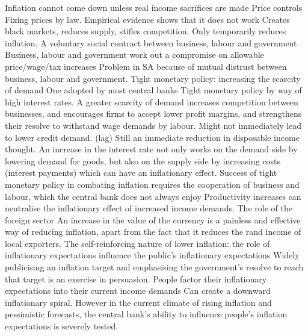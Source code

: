 \documentclass[12pt]{examnotes}
\begin{document}
\ra Inflation cannot come down unless real income sacrifices are made
 Price controls
\rna Fixing prices by law.
\rna Empirical evidence shows that it does not work
\rna Creates black markets, reduces supply, stifles competition.
\rna Only temporarily reduces inflation.
 A voluntary social contract between business, labour and government
\rna Business, labour and government work out a compromise on allowable price/wage/tax increases
\rna Problem in SA because of mutual distrust between business, labour and government.
 Tight monetary policy: increasing the scarcity of demand
\rna One adopted by most central banks 
\rna Tight monetary policy by way of high interest rates.
\rna A greater scarcity of demand increases competition between businesses, and encourages firms to accept lower profit margins, and strengthens their resolve to withstand wage demands by labour. 
\rna Might not immediately lead to lower credit demand. (lag) Still an immediate reduction in disposable income thought.
\rna An increase in the interest rate not only works on the demand side by lowering demand for goods, but also on the supply side by increasing costs (interest payments) which can have an inflationary effect.
\rna Success of tight monetary policy in combating inflation requires the cooperation of business and labour, which the central bank does not always enjoy
\rna Productivity increases can neutralise the inflationary effect of increased income demands.
 The role of the foreign sector
\rna An increase in the value of the currency is a painless and effective way of reducing inflation, apart from the fact that it reduces the rand income of local exporters.
 The self-reinforcing nature of lower inflation: the role of inflationary expectations
\rna influence the public's inflationary expectations 
\rna Widely publicising an inflation target and emphasising the government's resolve to reach that target is an exercise in persuasion.
\rna People factor their inflationary expectations into their current income demands
\rna Can create a downward inflationary spiral.
\rna  However in the current climate of rising inflation and pessimistic forecasts, the central bank's ability to influence people's inflation expectations is severely tested.
\end{document}
